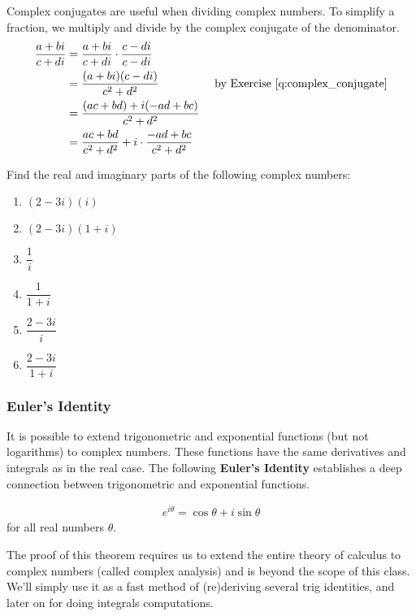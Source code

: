 \begin{example}
		Complex conjugates are useful when dividing complex numbers. To simplify a fraction, we multiply and divide by the complex conjugate of the denominator.
		\begin{align*}
			\dfrac{a+bi}{c+di}
			&=
			\dfrac{a+bi}{c+di} \cdot	\dfrac{c - di}{c-di}\\
			&=
			\dfrac{(a+bi)(c - di)}{c^2+d^2} & \mbox{ by Exercise \eqref{q:complex_conjugate}}\\\
			&=
			\dfrac{(ac + bd) + i(-ad + bc)}{c^2+d^2} \\
			&=
			\dfrac{ac + bd}{c^2+d^2}
			+
			i\cdot \dfrac{-ad + bc}{c^2+d^2}
		\end{align*}
\end{example}

\begin{exercise}
	Find the real and imaginary parts of the following complex numbers:
	\begin{multicols}{2}
		\begin{enumerate}
			\item $(2-3i)(i)$
				\item $(2-3i)(1+i)$
					\item $\dfrac{1}{i}$
						\item $\dfrac{1}{1+i}$
							\item $\dfrac{2-3i}{i}$
								\item $\dfrac{2-3i}{1+i}$
		\end{enumerate}
	\end{multicols}
\end{exercise}



\subsubsection{Euler's Identity}
It is possible to extend trigonometric and exponential functions (but not logarithms) to complex numbers.
These functions have the same derivatives and integrals as in the real case.
The following {\bf Euler's Identity} establishes a deep connection between trigonometric and exponential functions.
\begin{theorem}
\begin{align*}
		e^{i \theta} = \cos \theta + i \sin \theta
\end{align*}
for all real numbers $\theta$.
\end{theorem}
The proof of this theorem requires us to extend the entire theory of calculus to complex numbers (called complex analysis) and is beyond the scope of this class.
We'll simply use it as a fast method of (re)deriving several trig identities, and later on for doing integrals computations.

